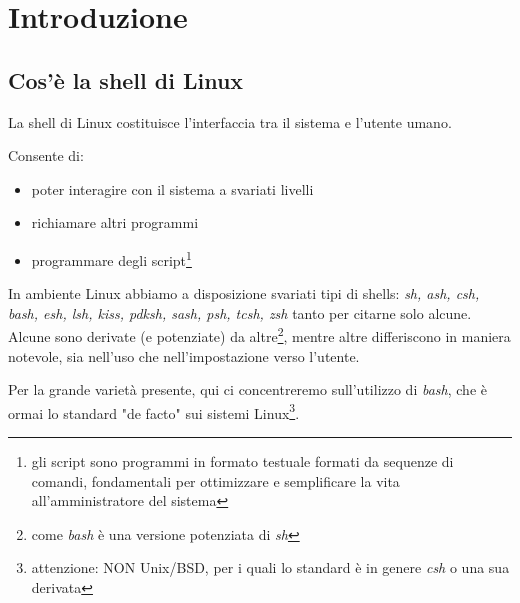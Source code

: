 \chapter{Introduzione}

\section{Cos'\`e la shell di Linux}
La shell di Linux costituisce l'interfaccia tra il sistema e l'utente umano.

Consente di:
\begin{itemize}
	\item poter interagire con il sistema a svariati livelli
	\item richiamare altri programmi
	\item programmare degli script\footnote{gli script sono programmi in
		formato testuale formati da sequenze di comandi, fondamentali
		per ottimizzare e semplificare la vita all'amministratore del
		sistema}
\end{itemize}

In ambiente Linux abbiamo a disposizione svariati tipi di shells: \emph{sh, ash,
csh, bash, esh, lsh, kiss, pdksh, sash, psh, tcsh, zsh} tanto per citarne solo
alcune. Alcune sono derivate (e potenziate) da altre\footnote{come \emph{bash} \`e
una versione potenziata di \emph{sh}}, mentre altre differiscono in maniera
notevole, sia nell'uso che nell'impostazione verso l'utente.

Per la grande variet\`a presente, qui ci concentreremo sull'utilizzo di
\emph{bash}, che \`e ormai lo standard "de facto" sui sistemi
Linux\footnote{attenzione: NON Unix/BSD, per i quali lo standard \`e in genere
\emph{csh} o una sua derivata}.

